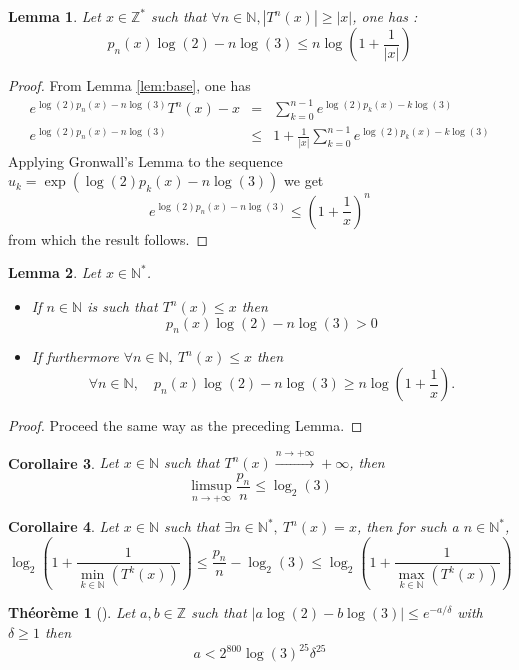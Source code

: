 \documentclass[12pt,a4paper]{article}
\newtheorem{lem}{Lemma}[section]
\newtheorem{cor}[lem]{Corollaire}
\newtheorem{theo}{Théorème}
\def\NN{\mathbb{N}}
\def\ZZ{\mathbb{Z}}
\begin{document}
\begin{lem}\label{lem:one_has} Let $x\in \ZZ^*$ such that $\forall n\in\NN, |T^n(x)|\geq |x|$, one has : $$p_n(x) \log(2) - n \log(3)\leq n\log\left(1+ \frac{1}{|x|}\right)  $$
\end{lem}
\begin{proof}
From Lemma \ref{lem:base}, one has 
\begin{eqnarray*}
e^{\log(2)p_n(x)-n\log(3)}T^n(x) - x &=& \sum_{k=0}^{n-1} e^{\log(2)p_k(x)-k\log(3)}
\\
e^{\log(2)p_n(x)-n\log(3)}&\leq &1+\frac{1}{|x|} \sum_{k=0}^{n-1} e^{\log(2)p_k(x)-k\log(3)}
\end{eqnarray*}
Applying Gronwall's Lemma to the sequence $u_k = \exp\left(\log(2)p_k(x)-n\log(3)\right)$ we get 
$$ e^{\log(2)p_n(x)-n\log(3)} \leq \left(1+\frac{1}{x}\right)^n$$
from which the result follows.
\end{proof}
\begin{lem}\label{lem:itemize_furthermore_itemize} Let $x\in \NN^*$.

\begin{itemize}
\item If $n\in\NN$ is such that $T^n(x)\leq x$ then 
$$p_n(x)\log(2)-n\log(3) >0$$ 
\item If furthermore $\forall n\in\NN,~T^n(x)\leq x $ then $$\forall n\in \NN,\quad  p_n(x)\log(2)-n\log(3) \geq n \log\left(1+\frac{1}{x} \right).$$ 
\end{itemize}


\end{lem}
\begin{proof}
Proceed the same way as the preceding Lemma.
\end{proof}
\begin{cor}\label{cor:corollary_2} Let $x\in \NN$ such that $T^n(x) \xrightarrow{n\rightarrow +\infty} +\infty$, then $$\limsup_{n\rightarrow+\infty} \frac{p_n}{n}\leq \log_2(3) $$
\end{cor}
\begin{cor}\label{cor:bounds} Let $x\in \NN$ such that $\exists n\in \NN^*,~ T^n(x) = x$, then for such a $n\in \NN^*$, $$\log_2\left(1+\frac{1}{\min_{k\in \NN}(T^k(x))}\right)  \leq \frac{p_n}{n}-\log_2(3)\leq  \log_2\left(1+\frac{1}{\max_{k\in \NN}(T^k(x))}\right) $$
\end{cor}

\begin{theo}[\cite{MR1074572}]\label{theo:mr}
Let $a,b\in \ZZ$ such that $|a\log(2)-b\log(3)|\leq e^{-a/\delta}$ with $\delta \geq 1$ then 
$$a < 2^{800}\log(3)^{25}\delta^{25} $$
\end{theo}
\end{document}
